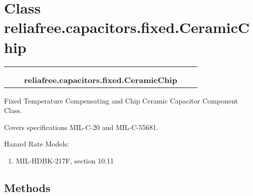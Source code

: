 %
%
%


\section{Class reliafree.capacitors.fixed.CeramicChip}

    \label{reliafree:capacitors:fixed:CeramicChip}
\begin{tabular}{cccccc}
\multicolumn{2}{r}{\settowidth{\BCL}{reliafree.capacitors.capacitor.Capacitor}\multirow{2}{\BCL}{reliafree.capacitors.capacitor.Capacitor}}
&&
  \\\cline{3-3}
  &&\multicolumn{1}{c|}{}
&&
  \\
&&\multicolumn{2}{l}{\textbf{reliafree.capacitors.fixed.CeramicChip}}
\end{tabular}

Fixed Temperature Compensating and Chip Ceramic Capacitor Component Class.

Covers specifications MIL-C-20 and MIL-C-55681.

Hazard Rate Models:

\begin{enumerate}

\setlength{\parskip}{0.5ex}
  \item MIL-HDBK-217F, section 10.11

\end{enumerate}



  \subsection{Methods}

